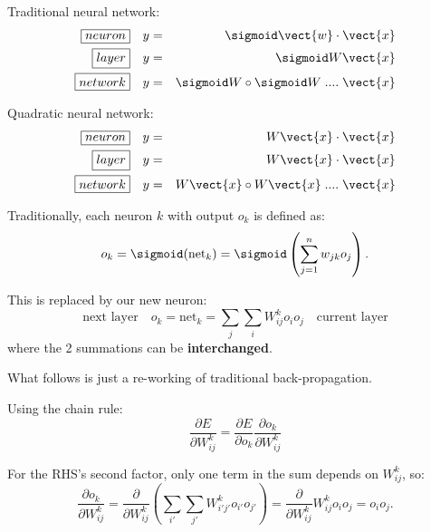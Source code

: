 Traditional neural network:
\begin{eqnarray}
\boxed{neuron} \quad & y = & \sigmoid \vect{w} \cdot \vect{x} \nonumber \\
\boxed{layer} \quad & y = & \sigmoid W \vect{x} \nonumber \\
\boxed{network} \quad & y = & \sigmoid W \circ \sigmoid W \; .... \; \vect{x} 
\end{eqnarray}

Quadratic neural network:
\begin{eqnarray}
\boxed{neuron} \quad & y = & W \vect{x} \cdot \vect{x} \nonumber \\
\boxed{layer} \quad & y = & W \vect{x} \cdot \vect{x} \nonumber \\
\boxed{network} \quad & y = & W \vect{x} \circ W \vect{x} \; .... \; \vect{x} 
\end{eqnarray}

Traditionally, each neuron $k$ with output $o_k$ is defined as:
\begin{equation}
o_k = \sigmoid ({\text{net}}_k) = \sigmoid \left(\sum _{j=1}^{n} w_{jk} o_j \right) .
\end{equation}

This is replaced by our new neuron:
\begin{equation}
\boxed{\mbox{next layer}} \quad
o_k = {\text{net}}_k = \sum_j \sum_i W_{ij}^k o_i o_j
\quad \boxed{\mbox{current layer}}
\end{equation}
where the 2 summations can be \textbf{interchanged}.

What follows is just a re-working of traditional back-propagation.

Using the chain rule:
\begin{equation}
\frac{\partial E}{\partial W_{ij}^k}
= \frac{\partial E}{\partial o_k} \frac{\partial o_k}{\partial W_{ij}^k}
\end{equation}

For the RHS's second factor, only one term in the sum depends on $W_{ij}^k$, so:
\begin{equation}
	\label{eqn:do-k-dW}
\frac{\partial o_k}{\partial W_{ij}^k}
= \frac{\partial }{\partial W_{ij}^k} \left( \sum_{i'} \sum_{j'} W_{i' j'}^k o_{i'} o_{j'} \right)
= \frac{\partial }{\partial W_{ij}^k} W_{ij}^k o_i o_j = o_i o_j .
\end{equation}

